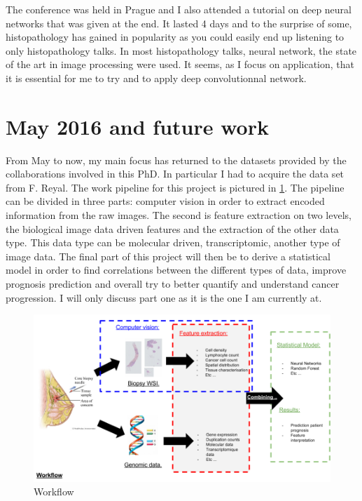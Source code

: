 \documentclass[a4paper,10pt]{article}
\begin{document}
The conference was held in Prague and I also attended a tutorial on deep neural networks that was given at the end. It lasted 4 days and to the surprise of some, histopathology has gained in popularity as you could easily end up listening to only histopathology talks. In most histopathology talks, neural network, the state of the art in image processing were used. It seems, as I focus on application, that it is essential for me to try and to apply deep convolutionnal network.


\section{May 2016 and future work}
From May to now, my main focus has returned to the datasets provided by the collaborations involved in this PhD. In particular I had to acquire the data set from F. Reyal. The work pipeline for this project is pictured in \ref{workflow1}. The pipeline can be divided in three parts: computer vision in order to extract encoded information from the raw images. The second is feature extraction on two levels, the biological image data driven features and the extraction of the other data type. This data type can be molecular driven, transcriptomic, another type of image data. The final part of this project will then be to derive a statistical model in order to find correlations between the different types of data, improve prognosis prediction and overall try to better quantify and understand cancer progression. I will only discuss part one as it is the one I am currently at.

\begin{figure}[!ht]
\centering
\includegraphics[width=\textwidth]{Workflow.png}
\caption{Workflow}
\label{workflow1}
\end{figure}
\end{document}
